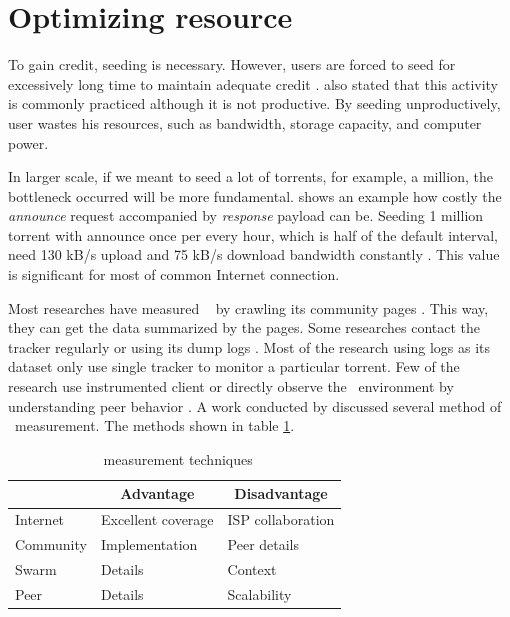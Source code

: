 \section{Optimizing resource}
To gain credit, seeding is necessary. However, users are forced to seed for excessively long time to maintain adequate credit \cite{2013:survivepriv:jia}. \citeauthor{2013:survivepriv:jia} also stated that this activity is commonly practiced although it is not productive. By seeding unproductively, user wastes his resources, such as bandwidth, storage capacity, and computer power.

In larger scale, if we meant to seed a lot of torrents, for example, a million, the bottleneck occurred will be more fundamental. \citeauthor{2012:milliontorrent:arvid} shows an example how costly the \textit{announce} request accompanied by \textit{response} payload can be. Seeding 1 million torrent with announce once per every hour, which is half of the default interval, need 130 kB/s upload and 75 kB/s download bandwidth constantly \cite{2012:milliontorrent:arvid}. This value is significant for most of common Internet connection.

Most researches have measured \bt~ by crawling its community pages \cite{2013:survivepriv:jia, 2005:bittorrentcooperation:andrade, 2014:userbehaviourprivate:jia, 2010:pubpriv:meulpolder, 2014:sustainabilitytorrent:chen, 2012:economicbt:kash, 2013:investmentcm:capota, 2009:demandsupplyres:andrade, 2011:interswarm:capota}. This way, they can get the data summarized by the pages. Some researches contact the tracker regularly or using its dump logs \cite{2011:yoshida:crawlbtnet, 2005:bittorrentcooperation:andrade,  2015:freeriderinbtcommunity:das, 2011:interswarm:capota}. Most of the research using logs as its dataset only use single tracker to monitor a particular torrent. Few of the research use instrumented client or directly observe the \bt~environment by understanding peer behavior \cite{2010:pubpriv:meulpolder, 2013:swarmevolution:su}. A work conducted by \citeauthor{2010:btworld:wojciechowski} discussed several method of \bt~measurement. The methods shown in table \ref{tbl:btmeasuremethod}.

\begin{table}[ht]
	\centering
	\caption{\bt~measurement techniques \cite{2010:btworld:wojciechowski}}
	\label{tbl:btmeasuremethod}
	\begin{tabular}{|l|l|l|}
		\hline
		\rowcolor[HTML]{C0C0C0} 
		\multicolumn{1}{|c|}{\cellcolor[HTML]{C0C0C0}\textbf{Level}} & \multicolumn{1}{c|}{\cellcolor[HTML]{C0C0C0}\textbf{Advantage}} & \multicolumn{1}{c|}{\cellcolor[HTML]{C0C0C0}\textbf{Disadvantage}} \\ \hline
		Internet & Excellent coverage & ISP collaboration \\ \hline
		Community & Implementation & Peer details \\ \hline
		Swarm & Details & Context \\ \hline
		Peer & Details & Scalability \\ \hline
	\end{tabular}
\end{table}

